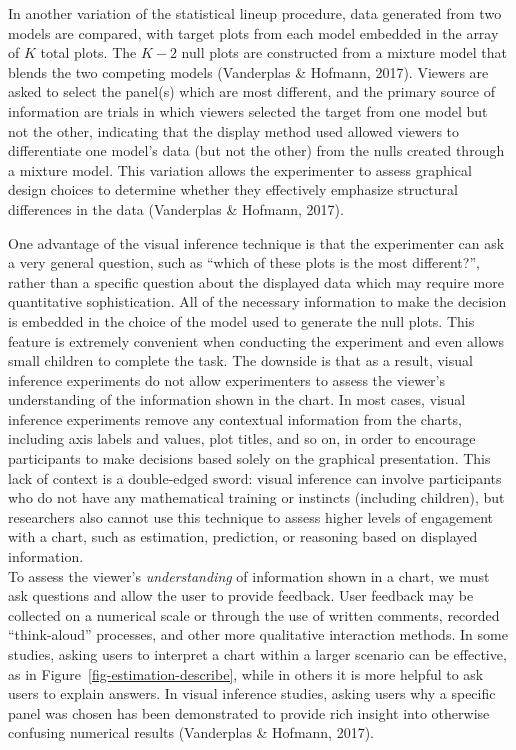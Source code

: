 \documentclass[
  10pt,
  letterpaper,
  DIV=11,
  numbers=noendperiod]{scrartcl}
\begin{document}
In another variation of the statistical lineup procedure, data generated
from two models are compared, with target plots from each model embedded
in the array of \(K\) total plots. The \(K-2\) null plots are
constructed from a mixture model that blends the two competing models
(Vanderplas \& Hofmann, 2017). Viewers are asked to select the panel(s)
which are most different, and the primary source of information are
trials in which viewers selected the target from one model but not the
other, indicating that the display method used allowed viewers to
differentiate one model's data (but not the other) from the nulls
created through a mixture model. This variation allows the experimenter
to assess graphical design choices to determine whether they effectively
emphasize structural differences in the data (Vanderplas \& Hofmann,
2017).

One advantage of the visual inference technique is that the experimenter
can ask a very general question, such as ``which of these plots is the
most different?'', rather than a specific question about the displayed
data which may require more quantitative sophistication. All of the
necessary information to make the decision is embedded in the choice of
the model used to generate the null plots. This feature is extremely
convenient when conducting the experiment and even allows small children
to complete the task. The downside is that as a result, visual inference
experiments do not allow experimenters to assess the viewer's
understanding of the information shown in the chart. In most cases,
visual inference experiments remove any contextual information from the
charts, including axis labels and values, plot titles, and so on, in
order to encourage participants to make decisions based solely on the
graphical presentation. This lack of context is a double-edged sword:
visual inference can involve participants who do not have any
mathematical training or instincts (including children), but researchers
also cannot use this technique to assess higher levels of engagement
with a chart, such as estimation, prediction, or reasoning based on
displayed information.\\

To assess the viewer's \emph{understanding} of information shown in a
chart, we must ask questions and allow the user to provide feedback.
User feedback may be collected on a numerical scale or through the use
of written comments, recorded ``think-aloud'' processes, and other more
qualitative interaction methods. In some studies, asking users to
interpret a chart within a larger scenario can be effective, as in
Figure~\ref{fig-estimation-describe}, while in others it is more helpful
to ask users to explain answers. In visual inference studies, asking
users why a specific panel was chosen has been demonstrated to provide
rich insight into otherwise confusing numerical results (Vanderplas \&
Hofmann, 2017).
\end{document}
